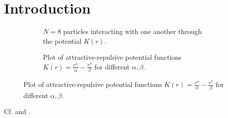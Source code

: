 \chapter{Introduction}
\label{chap:introduction}

\begin{figure}[H]
  \centering
  \begin{subfigure}[t]{0.5\textwidth}
    \centering
    \caption{$N = 8$ particles interacting with one another through the potential $K(r)$.}
    \label{fig:problem-setting}
  \end{subfigure}
  \hfill
  \begin{subfigure}[t]{0.49\textwidth}
    \centering
    \caption{Plot of attractive-repulsive potential functions $K(r) = \frac{r^\alpha}{\alpha} - \frac{r^\beta}{\beta}$ for different $\alpha, \beta$.}
    \label{fig:potential-function}
  \end{subfigure}
\end{figure}

Cf.  and .
